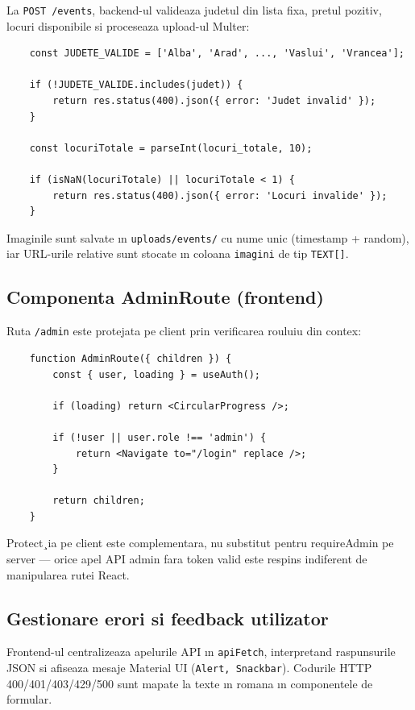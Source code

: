 La {\tt POST /events}, backend-ul valideaza judetul din lista fixa, pretul pozitiv, locuri disponibile si proceseaza upload-ul Multer:

\begin{lstlisting}
	const JUDETE_VALIDE = ['Alba', 'Arad', ..., 'Vaslui', 'Vrancea'];
	
	if (!JUDETE_VALIDE.includes(judet)) {
		return res.status(400).json({ error: 'Judet invalid' });
	}
	
	const locuriTotale = parseInt(locuri_totale, 10);
	
	if (isNaN(locuriTotale) || locuriTotale < 1) {
		return res.status(400).json({ error: 'Locuri invalide' });
	}
\end{lstlisting}

Imaginile sunt salvate ın {\tt uploads/events/} cu nume unic (timestamp + random), iar URL-urile relative sunt stocate ın coloana {\tt imagini} de tip {\tt TEXT[]}.

\subsection{Componenta AdminRoute (frontend)}
 Ruta {\tt /admin} este protejata pe client prin verificarea rouluiu din contex:
 
 \begin{lstlisting}
 	function AdminRoute({ children }) {
 		const { user, loading } = useAuth();
 		
 		if (loading) return <CircularProgress />;
 		
 		if (!user || user.role !== 'admin') {
 			return <Navigate to="/login" replace />;
 		}
 		
 		return children;
 	}
 \end{lstlisting}
 
 Protect¸ia pe client este complementara, nu substitut pentru requireAdmin pe server — orice apel API admin fara token valid este respins indiferent de manipularea rutei React. 
 
 \subsection{Gestionare erori si feedback utilizator}
 
 Frontend-ul centralizeaza apelurile API ın {\tt apiFetch}, interpretand raspunsurile JSON si afiseaza mesaje Material UI ({\tt Alert, Snackbar}). Codurile HTTP 400/401/403/429/500 sunt mapate la texte ın romana ın componentele de formular.
 
